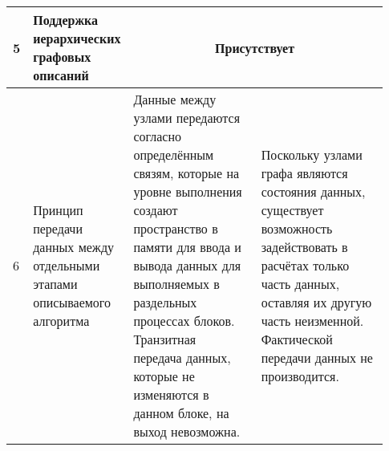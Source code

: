\begin{landscape}
\begin{longtable}{|p{0.03\linewidth}|p{0.2\linewidth}|p{0.35\linewidth}|p{0.35\linewidth}|}
        5          & Поддержка иерархических графовых описаний                                                  & \multicolumn{2}{c|}{Присутствует}                                                                                                                                                                                                                                                                                                                                                                                                                                                                                                                                                                                                                                                                                                                                                                                                                                                                                                                                     \\
        \hline
        6          & Принцип передачи данных между отдельными этапами описываемого алгоритма                    & Данные между узлами передаются согласно определённым связям, которые на уровне выполнения создают пространство в памяти для ввода и вывода данных для выполняемых в раздельных процессах блоков. Транзитная передача данных, которые не изменяются в данном блоке, на выход невозможна.                                                                                                                                                                                                                                                                                                                                                                            & Поскольку узлами графа являются состояния данных, существует возможность задействовать в расчётах только часть данных, оставляя их другую часть неизменной. Фактической передачи данных не производится.                                                                                         \\
        \hline

\end{longtable}
\end{landscape}
